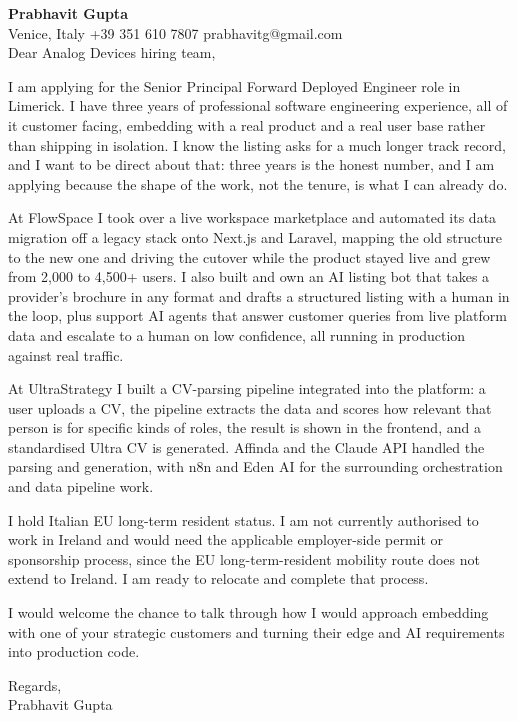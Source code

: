 \documentclass[a4paper,10.5pt]{article}
\begin{document}
\textbf{Prabhavit Gupta}\\
Venice, Italy \textbar{} +39 351 610 7807 \textbar{} prabhavitg@gmail.com\\[10pt]
Dear Analog Devices hiring team,

I am applying for the Senior Principal Forward Deployed Engineer role in Limerick. I have three years of professional software engineering experience, all of it customer facing, embedding with a real product and a real user base rather than shipping in isolation. I know the listing asks for a much longer track record, and I want to be direct about that: three years is the honest number, and I am applying because the shape of the work, not the tenure, is what I can already do.

At FlowSpace I took over a live workspace marketplace and automated its data migration off a legacy stack onto Next.js and Laravel, mapping the old structure to the new one and driving the cutover while the product stayed live and grew from 2,000 to 4,500+ users. I also built and own an AI listing bot that takes a provider's brochure in any format and drafts a structured listing with a human in the loop, plus support AI agents that answer customer queries from live platform data and escalate to a human on low confidence, all running in production against real traffic.

At UltraStrategy I built a CV-parsing pipeline integrated into the platform: a user uploads a CV, the pipeline extracts the data and scores how relevant that person is for specific kinds of roles, the result is shown in the frontend, and a standardised Ultra CV is generated. Affinda and the Claude API handled the parsing and generation, with n8n and Eden AI for the surrounding orchestration and data pipeline work.

I hold Italian EU long-term resident status. I am not currently authorised to work in Ireland and would need the applicable employer-side permit or sponsorship process, since the EU long-term-resident mobility route does not extend to Ireland. I am ready to relocate and complete that process.

I would welcome the chance to talk through how I would approach embedding with one of your strategic customers and turning their edge and AI requirements into production code.

Regards,\\
Prabhavit Gupta
\end{document}
